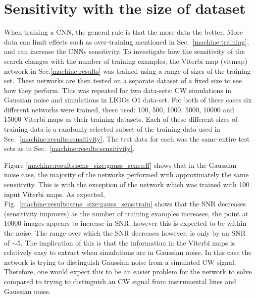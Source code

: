 \section{\label{machine:results:sens_size} Sensitivity with the size of dataset}

When training a \gls{CNN}, the general rule is that the more data the better. 
More data can limit effects such as over-training mentioned in Sec.~\ref{machine:training}, and can increase the \glspl{CNN} sensitivity.
To investigate how the sensitivity of the search changes with the number of training examples, the Viterbi map (vitmap) network in Sec.\ref{machine:results} was trained using a range of sizes of the training set. 
These networks are then tested on a separate dataset of a fixed size to see how they perform.
This was repeated for two data-sets: \gls{CW} simulations in Gaussian noise and simulations in \glspl{LIGO} O1 data-set. 
For both of these cases six different networks were trained, these used: 100, 500, 1000, 5000, 10000 and 15000 Viterbi maps as their training datasets.
Each of these different sizes of training data is a randomly selected subset of the training data used in Sec.~\ref{machine:results:sensitivity}.
The test data for each was the same entire test sets as in Sec.~\ref{machine:results:sensitivity}.

Figure \ref{machine:results:sens_size:gauss_sens:eff} shows that in the Gaussian noise case, the majority of the networks performed with approximately the same sensitivity. 
This is with the exception of the network which was trained with 100 input Viterbi maps. 
As expected, Fig.~\ref{machine:results:sens_size:gauss_sens:train} shows that the \gls{SNR} decreases (sensitivity improves) as the number of training examples increases, the point at 10000 images appears to increase in \gls{SNR}, however this is expected to be within the noise. The range over which the \gls{SNR} decreases however, is only by an \gls{SNR} of $\sim 5$. 
The implication of this is that the information in the Viterbi maps is relatively easy to extract when simulations are in Gaussian noise. 
In this case the network is trying to distinguish Gaussian noise from a simulated \gls{CW} signal.
Therefore, one would expect this to be an easier problem for the network to solve compared to trying to distinguish an \gls{CW} signal from instrumental lines and Gaussian noise. 

